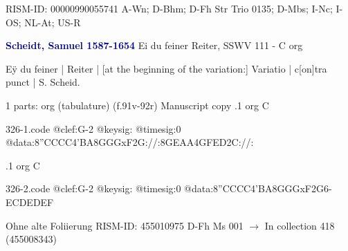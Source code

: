 \documentclass[twocolumn]{book}
\begin{document}
\newline RISM-ID: 00000990055741
\newline A-Wn; D-Bhm; D-Fh  Str Trio 0135; D-Mbs; I-Nc; I-OS; NL-At; US-R
\newline \par \vspace{7pt} \textcolor{darkblue}{\textbf{Scheidt, Samuel  1587-1654}}
\newline Ei du feiner Reiter, SSWV 111 - C
\newline org
\newline \begin{itshape}[f.91v, at left:] Eÿ du feiner | Reiter | [at the beginning of the variation:] Variatio | c[on]tra punct | S. Scheid.\end{itshape} 
\newline \textcolor{darkblue}{}  1 parts: org (tabulature)  (f.91v-92r)
\newline Manuscript copy
.1  org  C  
\begin{filecontents*}{326-1.code}
@clef:G-2
@keysig:
@timesig:0
@data:8''CCCC4'BA8GGGxF2G://:8GEAA4GFED2C://:
\end{filecontents*}
\newline
%

.1  org  C  
\begin{filecontents*}{326-2.code}
@clef:G-2
@keysig:
@timesig:0
@data:8''CCCC4'BA8GGGxF2G6-{ECD}{EDEF}
\end{filecontents*}
\newline
%

\newline Ohne alte Foliierung
\newline RISM-ID: 455010975
\newline D-Fh  Ms 001
\newline $\rightarrow$ In collection 418 (455008343)
      
\end{document}
